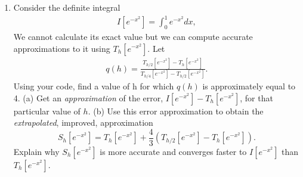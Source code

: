 \documentclass[11pt]{article}
\begin{document}
\begin{enumerate}
\item Consider the definite integral
\begin{align}
I[e^{-x^2}] = \int_0^1 e^{-x^2}dx,
\end{align}
We cannot calculate its exact value but we can compute accurate approximations to it using $T_h[e^{-x^2}]$. Let
\begin{align}
q(h) = \frac{T_{h/2}[e^{-x^2}] - T_h[e^{-x^2}]}{T_{h/4}[e^{-x^2}] - T_{h/2}[e^{-x^2}]}.
\end{align}
Using your code, find a value of h for which $q(h)$ is approximately equal to 4. (a) Get an \emph{approximation} of the error, $I[e^{-x^2}] - T_h[e^{-x^2}]$, for that particular value of $h$. (b) Use this error approximation to obtain the \emph{extrapolated}, improved, approximation
\begin{equation}
S_h[e^{-x^2}] = T_h[e^{-x^2}] + \frac{4}{3}\left(T_{h/2}[e^{-x^2}] - T_h[e^{-x^2}]\right).
\end{equation}
Explain why $S_h[e^{-x^2}]$ is more accurate and converges faster to $I[e^{-x^2}]$ than $T_h[e^{-x^2}]$.
\end{enumerate}
\end{document}
